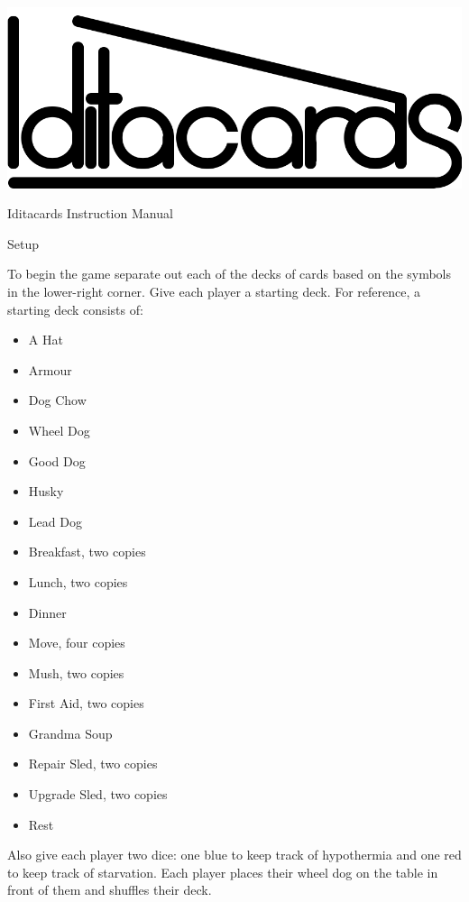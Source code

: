 \documentclass{article}
\begin{document}
\begin{titlepage}
\
\vfill
\centering
\includegraphics{iditacards}\par\vspace{5em}
{\Heading\LARGE Iditacards Instruction Manual\par}
\vfill
\end{titlepage}

{\noindent\Heading\Large Setup\par}

To begin the game separate out each of the decks of cards based on the
symbols in the lower-right corner. Give each player a starting deck. For
reference, a starting deck consists of:

\begin{itemize}[noitemsep]
\item A Hat
\item Armour
\item Dog Chow
\item Wheel Dog
\item Good Dog
\item Husky
\item Lead Dog
\item Breakfast, two copies
\item Lunch, two copies
\item Dinner
\item Move, four copies
\item Mush, two copies
\item First Aid, two copies
\item Grandma Soup
\item Repair Sled, two copies
\item Upgrade Sled, two copies
\item Rest
\end{itemize}

Also give each player two dice: one blue to keep track of hypothermia and one
red to keep track of starvation. Each player places their wheel dog on the
table in front of them and shuffles their deck.
\end{document}
